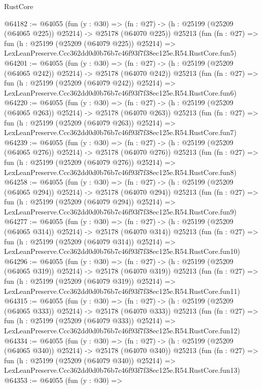 \begin{lexlean}{RustCore}
\begin{coremodule}
@64182 := @64055
    (fun (y : @30) =>
    (fn : @27) -> (h : @25199 (@25209 (@64065 @225)) @25214) -> @25178 (@64070 @225))
    @25213
    (fun (fn : @27) =>
    fun (h : @25199 (@25209 (@64079 @225)) @25214) =>
    LexLeanPreserve.Ccc362dd0d0b76b7c46f93f7f38ec125e.R54.RustCore.fun5)
@64201 := @64055
    (fun (y : @30) =>
    (fn : @27) -> (h : @25199 (@25209 (@64065 @242)) @25214) -> @25178 (@64070 @242))
    @25213
    (fun (fn : @27) =>
    fun (h : @25199 (@25209 (@64079 @242)) @25214) =>
    LexLeanPreserve.Ccc362dd0d0b76b7c46f93f7f38ec125e.R54.RustCore.fun6)
@64220 := @64055
    (fun (y : @30) =>
    (fn : @27) -> (h : @25199 (@25209 (@64065 @263)) @25214) -> @25178 (@64070 @263))
    @25213
    (fun (fn : @27) =>
    fun (h : @25199 (@25209 (@64079 @263)) @25214) =>
    LexLeanPreserve.Ccc362dd0d0b76b7c46f93f7f38ec125e.R54.RustCore.fun7)
@64239 := @64055
    (fun (y : @30) =>
    (fn : @27) -> (h : @25199 (@25209 (@64065 @276)) @25214) -> @25178 (@64070 @276))
    @25213
    (fun (fn : @27) =>
    fun (h : @25199 (@25209 (@64079 @276)) @25214) =>
    LexLeanPreserve.Ccc362dd0d0b76b7c46f93f7f38ec125e.R54.RustCore.fun8)
@64258 := @64055
    (fun (y : @30) =>
    (fn : @27) -> (h : @25199 (@25209 (@64065 @294)) @25214) -> @25178 (@64070 @294))
    @25213
    (fun (fn : @27) =>
    fun (h : @25199 (@25209 (@64079 @294)) @25214) =>
    LexLeanPreserve.Ccc362dd0d0b76b7c46f93f7f38ec125e.R54.RustCore.fun9)
@64277 := @64055
    (fun (y : @30) =>
    (fn : @27) -> (h : @25199 (@25209 (@64065 @314)) @25214) -> @25178 (@64070 @314))
    @25213
    (fun (fn : @27) =>
    fun (h : @25199 (@25209 (@64079 @314)) @25214) =>
    LexLeanPreserve.Ccc362dd0d0b76b7c46f93f7f38ec125e.R54.RustCore.fun10)
@64296 := @64055
    (fun (y : @30) =>
    (fn : @27) -> (h : @25199 (@25209 (@64065 @319)) @25214) -> @25178 (@64070 @319))
    @25213
    (fun (fn : @27) =>
    fun (h : @25199 (@25209 (@64079 @319)) @25214) =>
    LexLeanPreserve.Ccc362dd0d0b76b7c46f93f7f38ec125e.R54.RustCore.fun11)
@64315 := @64055
    (fun (y : @30) =>
    (fn : @27) -> (h : @25199 (@25209 (@64065 @333)) @25214) -> @25178 (@64070 @333))
    @25213
    (fun (fn : @27) =>
    fun (h : @25199 (@25209 (@64079 @333)) @25214) =>
    LexLeanPreserve.Ccc362dd0d0b76b7c46f93f7f38ec125e.R54.RustCore.fun12)
@64334 := @64055
    (fun (y : @30) =>
    (fn : @27) -> (h : @25199 (@25209 (@64065 @340)) @25214) -> @25178 (@64070 @340))
    @25213
    (fun (fn : @27) =>
    fun (h : @25199 (@25209 (@64079 @340)) @25214) =>
    LexLeanPreserve.Ccc362dd0d0b76b7c46f93f7f38ec125e.R54.RustCore.fun13)
@64353 := @64055
    (fun (y : @30) =>

\end{coremodule}
\end{lexlean}
